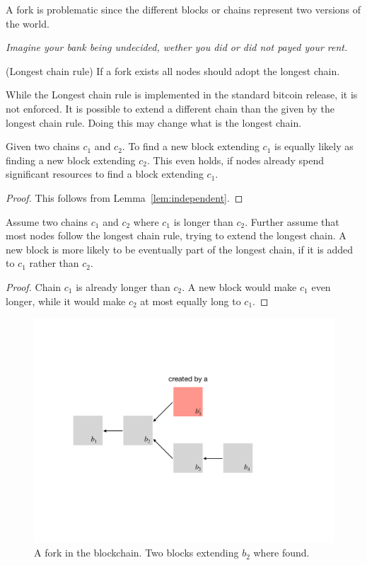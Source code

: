 A fork is problematic since the different blocks or chains represent two versions of the world. 
	
\emph{Imagine your bank being undecided, wether you did or did not payed your rent.}

\begin{definition} (Longest chain rule) If a fork exists all nodes should adopt the longest chain.
\end{definition}

\begin{note} While the Longest chain rule is implemented in the standard bitcoin release, it is not enforced. It is possible to extend a different chain than the given by the longest chain rule. Doing this may change what is the longest chain. 
\end{note}

\begin{lem}
	Given two chains $c_1$ and $c_2$. To find a new block extending $c_1$ is equally likely as finding a new block extending $c_2$. This even holds, if nodes already spend significant resources to find a block extending $c_1$.
\end{lem}
\begin{proof} This follows from Lemma~\ref{lem:independent}.
\end{proof}

\begin{lem}
Assume two chains $c_1$ and $c_2$ where $c_1$ is longer than $c_2$. Further assume that most nodes follow the longest chain rule, trying to extend the longest chain.
	A new block is more likely to be eventually part of the longest chain, if it is added to $c_1$ rather than $c_2$.
\end{lem}
\begin{proof}
Chain $c_1$ is already longer than $c_2$. A new block would make $c_1$ even longer, while it would make $c_2$ at most equally long to $c_1$.
\end{proof}

\begin{figure}
	
	\includegraphics[width=\textwidth]{fig/fork}
	\caption{A fork in the blockchain. Two blocks extending $b_2$ where found.}
	\label{fig:fork}
\end{figure}

